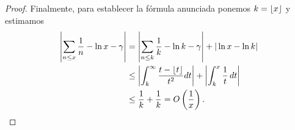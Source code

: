 \begin{proof}
Finalmente, para establecer la f\'ormula anunciada ponemos $k=\left\lfloor x \right\rfloor$ y estimamos 
\begin{align}
\left|\sum_{n \le x} \frac{1}{n} - \ln x  - \gamma \right| &= \left|\sum_{n \le k} \frac{1}{k}  -\ln k -\gamma \right| + |\ln x -\ln k |  \\
& \le \left|   \int_k^\infty \frac{t - \left\lfloor t \right\rfloor}{t^2} dt \right| + \left| \int_k^x  \frac{1}{t}\,dt  \right| \\
& \le \frac{1}{k} + \frac{1}{k} = O\left(\frac{1}{x}\right). 
\end{align}
\end{proof}

